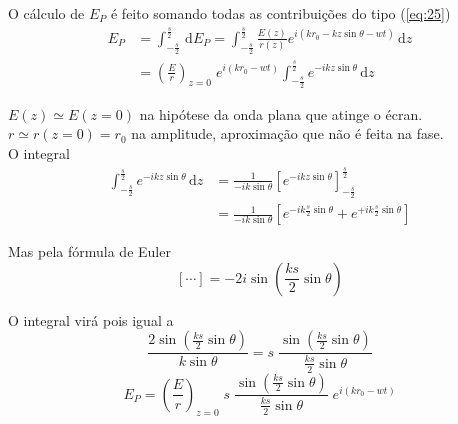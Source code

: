 \documentclass[a4paper,12pt]{article}
\newcommand{\ud}{\,\mathrm{d}}
\begin{document}
O cálculo de $E_P$ é feito somando todas as contribuições do tipo (\ref{eq:25}) 
\begin{align}
	E_P &= \int_{-\frac{s}{2}}^\frac{s}{2} \ud E_P = \int_{-\frac{s}{2}}^\frac{s}{2} \frac{E(z)}{r(z)} e^{i (k r_0 - k z \sin \theta -w t) } \ud z \nonumber\\
	&= ( \frac{E}{r} )_{z=0}\; e^{i (k r_0 -w t) } \int_{-\frac{s}{2}}^\frac{s}{2} e^{ -i k z \sin \theta } \ud z 
\end{align}

$E(z) \simeq E(z=0) $ na hipótese da onda plana que atinge o écran.\\
$r \simeq r(z=0) = r_0 $ na amplitude, aproximação que não é feita na fase.\\
O integral 
\begin{align} \label{eq:28}
	\int_{-\frac{s}{2}}^\frac{s}{2} e^{ -i k z \sin \theta } \ud z &= \frac{1}{-i k \sin \theta } \left[ e^{ -i k z \sin \theta } \right]_{-\frac{s}{2}}^\frac{s}{2}\nonumber \\
	&= \frac{1}{-i k  \sin \theta } \left[ e^{ -i k \frac{s}{2} \sin \theta } + e^{ +i k \frac{s}{2} \sin \theta } \right] 
\end{align}

Mas pela fórmula de Euler 
\begin{equation}
	\label{eq:29} \left[ \cdots \right] = -2 i \sin( \frac{k s}{2}\sin \theta) 
\end{equation}

O integral virá pois igual a 
\begin{equation*}
	\frac{2 \sin( \frac{k s}{2}\sin \theta)}{  k \sin \theta}= s \; \frac{ \sin( \frac{k s}{2}\sin \theta)}{ \frac{k s}{2}\sin \theta} 
\end{equation*}
\begin{equation}
	\label{eq:30} E_P = \left( \frac{E}{r} \right)_{z=0} \; s  \;\frac{ \sin( \frac{k s}{2}\sin \theta)}{ \frac{k s}{2}\sin \theta}  \; e^{i(k r_0 -wt) }
\end{equation}
\end{document}
